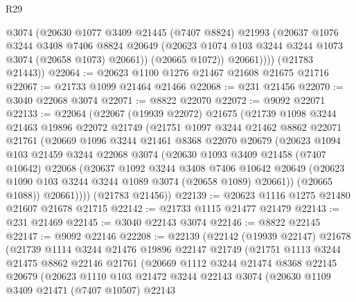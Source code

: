 \begin{lexlean}{R29}
\begin{coremodule}
              @3074
              (@20630
                @1077
                @3409
                @21445
                (@7407 @8824)
                @21993
                (@20637
                  @1076
                  @3244
                  @3408
                  @7406
                  @8824
                  @20649
                  (@20623 @1074 @103 @3244 @3244 @1073 @3074 (@20658 @1073) @20661))
                (@20665 @1072))
              @20661))))
      (@21783 @21443))
@22064 := @20623 @1100 @1276 @21467 @21608 @21675 @21716
@22067 := @21733 @1099 @21464 @21466
@22068 := @231 @21456
@22070 := @3040 @22068 @3074
@22071 := @8822 @22070
@22072 := @9092 @22071
@22133 := @22064
    (@22067
      (@19939 @22072)
      @21675
      (@21739
        @1098
        @3244
        @21463
        @19896
        @22072
        @21749
        (@21751
          @1097
          @3244
          @21462
          @8862
          @22071
          @21761
          (@20669
            @1096
            @3244
            @21461
            @8368
            @22070
            @20679
            (@20623
              @1094
              @103
              @21459
              @3244
              @22068
              @3074
              (@20630
                @1093
                @3409
                @21458
                (@7407 @10642)
                @22068
                (@20637
                  @1092
                  @3244
                  @3408
                  @7406
                  @10642
                  @20649
                  (@20623 @1090 @103 @3244 @3244 @1089 @3074 (@20658 @1089) @20661))
                (@20665 @1088))
              @20661))))
      (@21783 @21456))
@22139 := @20623 @1116 @1275 @21480 @21607 @21678 @21715
@22142 := @21733 @1115 @21477 @21479
@22143 := @231 @21469
@22145 := @3040 @22143 @3074
@22146 := @8822 @22145
@22147 := @9092 @22146
@22208 := @22139
    (@22142
      (@19939 @22147)
      @21678
      (@21739
        @1114
        @3244
        @21476
        @19896
        @22147
        @21749
        (@21751
          @1113
          @3244
          @21475
          @8862
          @22146
          @21761
          (@20669
            @1112
            @3244
            @21474
            @8368
            @22145
            @20679
            (@20623
              @1110
              @103
              @21472
              @3244
              @22143
              @3074
              (@20630
                @1109
                @3409
                @21471
                (@7407 @10507)
                @22143

\end{coremodule}
\end{lexlean}
